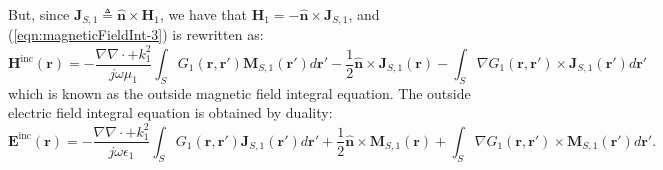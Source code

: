 \documentclass[a4paper,10pt]{book}
\newcommand{\field}[1]{\mathbf{#1}}
\newcommand{\current}[1]{\mathbf{#1}}
\newcommand{\vect}[1]{\mathbf{#1}}
\begin{document}
But, since $\current{J}_{S,1} \triangleq \vect{\hat{n}} \times \field{H}_1$, we have that $\field{H}_1 = -\vect{\hat{n}} \times \current{J}_{S,1}$, and (\ref{eqn:magneticFieldInt-3}) is rewritten as:
\begin{equation}\label{eqn:MFIE-O}
\boxed{
\field{H}^\text{inc}\left(\vect{r}\right) =  - \frac{\nabla \nabla \cdot + k_1^2}{j \omega \mu_1} \int_S G_1(\vect{r}, \vect{r}') \current{M}_{S,1}\left(\vect{r}'\right) d\vect{r}' - \frac{1}{2} \vect{\hat{n}} \times \current{J}_{S,1}\left(\vect{r}\right) - \int_S \nabla G_1(\vect{r}, \vect{r}') \times \current{J}_{S,1}\left(\vect{r}'\right) d\vect{r}'}
\end{equation}
which is known as the outside magnetic field integral equation. The outside electric field integral equation is obtained by duality:
\begin{equation}\label{eqn:EFIE-O}
\boxed{
\field{E}^\text{inc}\left(\vect{r}\right) =  -\frac{\nabla \nabla \cdot + k_1^2}{j \omega \epsilon_1} \int_S G_1(\vect{r}, \vect{r}') \current{J}_{S,1}\left(\vect{r}'\right) d\vect{r}' + \frac{1}{2} \vect{\hat{n}} \times \current{M}_{S,1}\left(\vect{r}\right) + \int_S \nabla G_1(\vect{r}, \vect{r}') \times \current{M}_{S,1}\left(\vect{r}'\right) d\vect{r}'}.
\end{equation}
\end{document}
